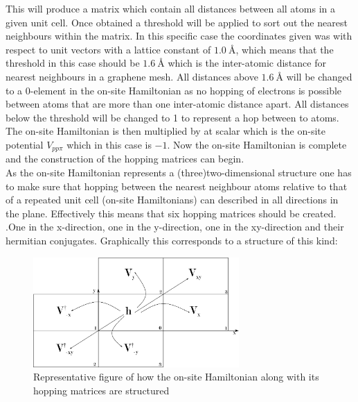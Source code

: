 This will produce a matrix which contain all distances between all atoms in a given unit cell.  Once obtained a threshold will be applied to sort out the nearest neighbours within the matrix. In this specific case the coordinates given was with respect to unit vectors with a lattice constant of \(\SI{1.0}{\angstrom}\), which means that the threshold in this case should be \(\SI{1.6}{\angstrom}\) which is the inter-atomic distance for nearest neighbours in a graphene mesh. All distances above \(\SI{1.6}{\angstrom}\) will be changed to a 0-element in the on-site Hamiltonian as no hopping of electrons is possible between atoms that are more than one inter-atomic distance apart. All distances below the threshold will be changed to 1 to represent a hop between to atoms. The on-site Hamiltonian is then multiplied by at scalar which is the on-site potential \(V_{pp\pi}\) which in this case is \(-1\). Now the on-site Hamiltonian is complete and the construction of the hopping matrices can begin. \\
As the on-site Hamiltonian represents a (three)two-dimensional structure one has to make sure that hopping between the nearest neighbour atoms relative to that of a repeated unit cell (on-site Hamiltonians) can described in all directions in the plane. Effectively this means that six hopping matrices should be created. .One in the x-direction, one in the y-direction, one in the xy-direction and their hermitian conjugates. Graphically this corresponds to a structure of this kind:
\begin{figure}[H]
	\centering
	\includegraphics[width = 0.7\textwidth]{Figures/repfig.eps}
	\caption{Representative figure of how the on-site Hamiltonian along with its hopping matrices are structured}
	\label{repfig}
\end{figure}
